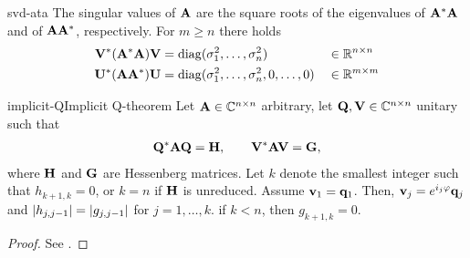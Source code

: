 \begin{Lemma}{svd-ata}
  The singular values of $\mathbf A$ are the square roots of the
  eigenvalues of $\mathbf A^*\mathbf A$ and of $\mathbf A\mathbf A^*$, respectively. For $m\ge n$ there holds
  \begin{align}
    \mathbf V^*(\mathbf A^*\mathbf A)\mathbf V &= \operatorname{diag}(\sigma_1^2,\dots,\sigma_n^2)
    &&\in \mathbb R^{n\times n}\\
    \mathbf U^*(\mathbf A\mathbf A^*)\mathbf U &= \operatorname{diag}(\sigma_1^2,\dots,\sigma_n^2, 0,\dots,0)
    &&\in \mathbb R^{m\times m}
  \end{align}
\end{Lemma}

\begin{Theorem*}{implicit-Q}{Implicit Q-theorem}
  Let $\mathbf A\in\mathbb C^{n\times n}$ arbitrary, let $\mathbf Q,\mathbf V\in\mathbb C^{n\times n}$ unitary such that
  \begin{gather}
    \mathbf Q^*\mathbf A\mathbf Q = \mathbf H,\qquad \mathbf V^*\mathbf A\mathbf V = \mathbf G,
  \end{gather}
  where $\mathbf H$ and $\mathbf G$ are Hessenberg matrices. Let $k$ denote
  the smallest integer such that $h_{k+1,k} = 0$, or $k=n$ if $\mathbf H$
  is unreduced. Assume $\mathbf v_1 = \mathbf q_1$. Then,
  $\mathbf v_j = e^{i_j\varphi}\mathbf q_j$ and $\lvert h_{j,j-1}\rvert = \lvert g_{j,j-1}\rvert$
  for $j=1,\dots,k$. if $k<n$, then $g_{k+1,k} = 0$.
\end{Theorem*}

\begin{proof}
  See \cite[Theorem 7.4-2]{GolubVanLoan83}.
\end{proof}

